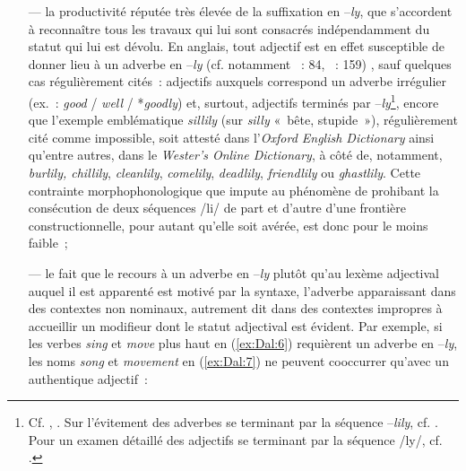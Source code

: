 \documentclass[output=paper]{langsci/langscibook}
\begin{document}
\begin{itemize}
\item[---] la productivité réputée très élevée de la suffixation en --\emph{ly}, que s'accordent à reconnaître tous les travaux qui lui sont consacrés indépendamment du statut qui lui est dévolu. En anglais, tout adjectif est en effet susceptible de donner lieu à un adverbe en --\emph{ly} %
(cf. notamment %
\citealt{Bybee85}%
~: 84, 
\citealt{Scalise05}
~: 159)
%
, sauf quelques cas régulièrement cités~: adjectifs auxquels correspond un adverbe irrégulier (ex.~: \emph{good} / \emph{well} / *\emph{goodly}) et, surtout, adjectifs terminés par --\emph{ly}\footnote{Cf. %
\citet[84--85]{Bybee85}%
%
, %
\citet[195]{Anderson92}%
%
. Sur l'évitement des adverbes se terminant par la séquence --\emph{lily}, cf. %
\citet{Bauer83,Bauer92,Bauer01}%
%
. Pour un examen détaillé des adjectifs se terminant par la séquence /ly/, cf. %
\citet[chap. 15]{Bauer.2013}%
%
.}, encore que l'exemple emblématique \emph{sillily} (sur \emph{silly} «~bête, stupide~»), régulièrement cité comme impossible, soit attesté dans l'\emph{Oxford English Dictionary} ainsi qu'entre autres, dans le \emph{Wester's Online Dictionary}, à côté de, notamment, \emph{burlily, chillily}, \emph{cleanlily}, \emph{comelily}, \emph{deadlily}, \emph{friendlily}
 ou \emph{ghastlily}. Cette contrainte morphophonologique que %
\citet[216]{Stekauer2005a} %
%
impute au phénomène de  prohibant la consécution de deux séquences /li/ de part et d'autre d'une frontière constructionnelle, pour autant qu'elle soit avérée, est donc pour le moins faible~;

\item[---] le fait que le recours à un adverbe en --\emph{ly} plutôt qu'au lexème adjectival auquel il est apparenté est motivé par la syntaxe, l'adverbe apparaissant dans des contextes non nominaux, autrement dit dans des contextes impropres à accueillir un modifieur dont le statut adjectival est évident. Par exemple, si les verbes \emph{sing} et \emph{move} plus haut en (\ref{ex:Dal:6}) requièrent un adverbe en --\emph{ly}, les noms \emph{song} et \emph{movement} en (\ref{ex:Dal:7}) ne peuvent cooccurrer qu'avec un authentique adjectif~:


\end{itemize}
\end{document}
